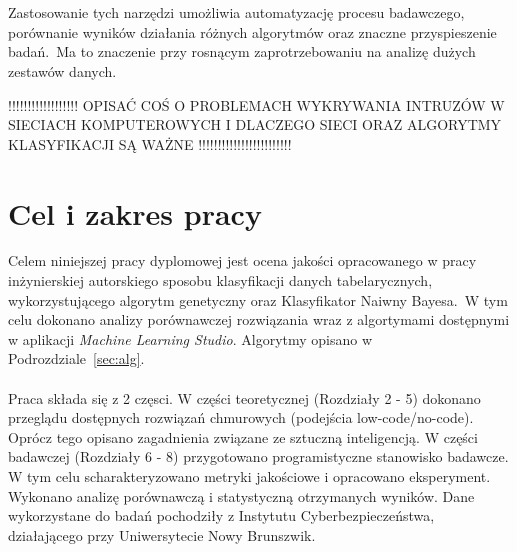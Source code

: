 \\ \\
Zastosowanie tych narzędzi umożliwia automatyzację procesu badawczego, porównanie wyników działania różnych algorytmów oraz znaczne przyspieszenie badań.\ Ma to znaczenie przy rosnącym zaprotrzebowaniu na analizę dużych zestawów danych.



!!!!!!!!!!!!!!!!!!
OPISAĆ COŚ O PROBLEMACH WYKRYWANIA INTRUZÓW W SIECIACH KOMPUTEROWYCH I DLACZEGO SIECI ORAZ ALGORYTMY KLASYFIKACJI SĄ WAŻNE
!!!!!!!!!!!!!!!!!!!!!!!!



\section{Cel i zakres pracy}
Celem niniejszej pracy dyplomowej jest ocena jakości opracowanego w pracy inżynierskiej autorskiego sposobu klasyfikacji danych tabelarycznych, wykorzystującego algorytm genetyczny oraz Klasyfikator Naiwny Bayesa.\ W tym celu dokonano analizy porównawczej rozwiązania wraz z algortymami dostępnymi w aplikacji \textit{Machine Learning Studio}. Algorytmy opisano w Podrozdziale~\ref{sec:alg}.
\\ \\
Praca składa się z 2 częsci. W części teoretycznej (Rozdziały 2 - 5) dokonano przeglądu dostępnych rozwiązań chmurowych (podejścia low-code/no-code). Oprócz tego opisano zagadnienia związane ze sztuczną inteligencją. W części badawczej (Rozdziały 6 - 8) przygotowano programistyczne stanowisko badawcze. W tym celu scharakteryzowano metryki jakościowe i opracowano eksperyment. Wykonano analizę porównawczą i statystyczną otrzymanych wyników. Dane wykorzystane do badań pochodziły z Instytutu Cyberbezpieczeństwa, działającego przy Uniwersytecie Nowy Brunszwik.

